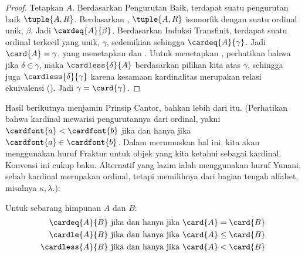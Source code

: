 \documentclass[../../../include/open-logic-section]{subfiles}
\begin{document}
\begin{proof}
Tetapkan $A$. Berdasarkan Pengurutan Baik, terdapat suatu pengurutan baik
$\tuple{A, R}$. Berdasarkan
, $\tuple{A, R}$
isomorfik dengan suatu ordinal unik, $\beta$. Jadi
$\cardeq{A}{\beta}$. Berdasarkan Induksi Transfinit, terdapat suatu ordinal
terkecil yang unik, $\gamma$, sedemikian sehingga
$\cardeq{A}{\gamma}$. Jadi $\card{A} = \gamma$, yang menetapkan
 dan . Untuk menetapkan
, perhatikan bahwa jika $\delta \in \gamma$, maka
$\cardless{\delta}{A}$ berdasarkan pilihan kita atas $\gamma$, sehingga juga
$\cardless{\delta}{\gamma}$ karena kesamaan kardinalitas merupakan relasi
ekuivalensi (). Jadi $\gamma =
\card{\gamma}$.
\end{proof}

Hasil berikutnya menjamin Prinsip Cantor, bahkan lebih dari itu. (Perhatikan
bahwa kardinal mewarisi pengurutannya dari ordinal, yakni
$\cardfont{a} < \cardfont{b}$ jika dan hanya jika
$\cardfont{a} \in \cardfont{b}$. Dalam merumuskan hal ini, kita akan
menggunakan huruf Fraktur untuk objek yang kita ketahui sebagai kardinal.
Konvensi ini cukup baku. Alternatif yang lazim ialah menggunakan huruf Yunani,
sebab kardinal merupakan ordinal, tetapi memilihnya dari bagian tengah
alfabet, misalnya $\kappa, \lambda$.):
\begin{lem}
Untuk sebarang himpunan $A$ dan $B$:
\begin{align*}
	\cardeq{A}{B} &\text{ jika dan hanya jika } \card{A} = \card{B}\\
	\cardle{A}{B} &\text{ jika dan hanya jika } \card{A} \leq \card{B}\\
	\cardless{A}{B}&\text{ jika dan hanya jika } \card{A} < \card{B}
\end{align*}
\end{lem}
\end{document}
